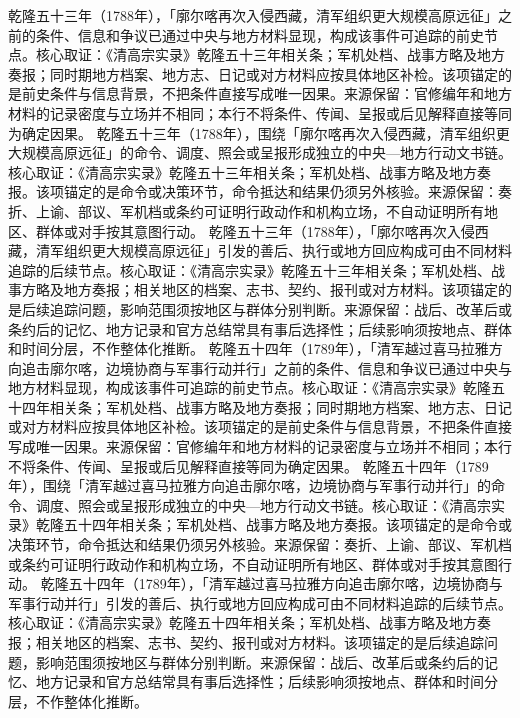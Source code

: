 乾隆五十三年（1788年），「廓尔喀再次入侵西藏，清军组织更大规模高原远征」之前的条件、信息和争议已通过中央与地方材料显现，构成该事件可追踪的前史节点。核心取证：《清高宗实录》乾隆五十三年相关条；军机处档、战事方略及地方奏报；同时期地方档案、地方志、日记或对方材料应按具体地区补检。该项锚定的是前史条件与信息背景，不把条件直接写成唯一因果。来源保留：官修编年和地方材料的记录密度与立场并不相同；本行不将条件、传闻、呈报或后见解释直接等同为确定因果。
乾隆五十三年（1788年），围绕「廓尔喀再次入侵西藏，清军组织更大规模高原远征」的命令、调度、照会或呈报形成独立的中央—地方行动文书链。核心取证：《清高宗实录》乾隆五十三年相关条；军机处档、战事方略及地方奏报。该项锚定的是命令或决策环节，命令抵达和结果仍须另外核验。来源保留：奏折、上谕、部议、军机档或条约可证明行政动作和机构立场，不自动证明所有地区、群体或对手按其意图行动。
乾隆五十三年（1788年），「廓尔喀再次入侵西藏，清军组织更大规模高原远征」引发的善后、执行或地方回应构成可由不同材料追踪的后续节点。核心取证：《清高宗实录》乾隆五十三年相关条；军机处档、战事方略及地方奏报；相关地区的档案、志书、契约、报刊或对方材料。该项锚定的是后续追踪问题，影响范围须按地区与群体分别判断。来源保留：战后、改革后或条约后的记忆、地方记录和官方总结常具有事后选择性；后续影响须按地点、群体和时间分层，不作整体化推断。
乾隆五十四年（1789年），「清军越过喜马拉雅方向追击廓尔喀，边境协商与军事行动并行」之前的条件、信息和争议已通过中央与地方材料显现，构成该事件可追踪的前史节点。核心取证：《清高宗实录》乾隆五十四年相关条；军机处档、战事方略及地方奏报；同时期地方档案、地方志、日记或对方材料应按具体地区补检。该项锚定的是前史条件与信息背景，不把条件直接写成唯一因果。来源保留：官修编年和地方材料的记录密度与立场并不相同；本行不将条件、传闻、呈报或后见解释直接等同为确定因果。
乾隆五十四年（1789年），围绕「清军越过喜马拉雅方向追击廓尔喀，边境协商与军事行动并行」的命令、调度、照会或呈报形成独立的中央—地方行动文书链。核心取证：《清高宗实录》乾隆五十四年相关条；军机处档、战事方略及地方奏报。该项锚定的是命令或决策环节，命令抵达和结果仍须另外核验。来源保留：奏折、上谕、部议、军机档或条约可证明行政动作和机构立场，不自动证明所有地区、群体或对手按其意图行动。
乾隆五十四年（1789年），「清军越过喜马拉雅方向追击廓尔喀，边境协商与军事行动并行」引发的善后、执行或地方回应构成可由不同材料追踪的后续节点。核心取证：《清高宗实录》乾隆五十四年相关条；军机处档、战事方略及地方奏报；相关地区的档案、志书、契约、报刊或对方材料。该项锚定的是后续追踪问题，影响范围须按地区与群体分别判断。来源保留：战后、改革后或条约后的记忆、地方记录和官方总结常具有事后选择性；后续影响须按地点、群体和时间分层，不作整体化推断。
